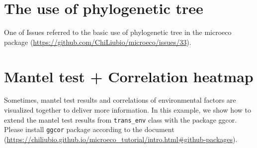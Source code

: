 \documentclass[
]{book}
\begin{document}
\hypertarget{the-use-of-phylogenetic-tree}{%
\section{The use of phylogenetic tree}\label{the-use-of-phylogenetic-tree}}

One of Issues referred to the basic use of phylogenetic tree in the microeco package (\url{https://github.com/ChiLiubio/microeco/issues/33}).

\hypertarget{mantel-test-correlation-heatmap}{%
\section{Mantel test + Correlation heatmap}\label{mantel-test-correlation-heatmap}}

Sometimes, mantel test results and correlations of environmental factors are visualized together to deliver more information.
In this example, we show how to extend the mantel test results from \texttt{trans\_env} class with the package ggcor.
Please install \texttt{ggcor} package according to the document (\url{https://chiliubio.github.io/microeco_tutorial/intro.html\#github-packages}).
\end{document}
